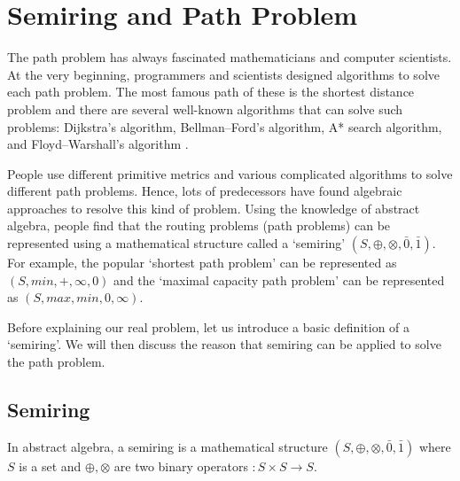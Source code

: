 \documentclass[a4paper,12pt,twoside,openright]{report}
\begin{document}
\section{Semiring and Path Problem}
The path problem has always fascinated mathematicians and computer scientists. 
At the very beginning, programmers and scientists designed algorithms to solve each path problem. 
The most famous path of these is the shortest distance problem and there are several well-known algorithms that can solve such problems: Dijkstra's algorithm, Bellman–Ford’s algorithm, A* search algorithm, and Floyd–Warshall’s algorithm \cite{cormen_introduction_2009}. 


People use different primitive metrics and various complicated algorithms to solve different path problems.
Hence, lots of predecessors have found algebraic approaches to resolve this kind of problem. 
Using the knowledge of abstract algebra, people find that the routing problems (path problems) can be represented using a mathematical structure called a ‘semiring’ $(S,\oplus,\otimes,\bar{0},\bar{1})$\cite{carre_algebra_1971,WONGSEELASHOTE197955,dynerowicz_forwarding_2013,mohri_semiring_2002,gurney_lexicographic_2007}. For example, the popular ‘shortest path problem’ can be represented as $(S, min,+,\infty,0)$\cite{mohri_semiring_2002} and the ‘maximal capacity path problem’ can be represented as $(S, max,min, 0, \infty)$. 

Before explaining our real problem, let us introduce a basic definition of a ‘semiring’. We will then discuss the reason that semiring can be applied to solve the path problem. 
\subsection{Semiring}
In abstract algebra, a semiring is a mathematical structure $(S,\oplus,\otimes,\bar0,\bar1)$ where $S$ is a set and $\oplus,\otimes$ are two binary operators $:S\times S \rightarrow S$.
\end{document}
